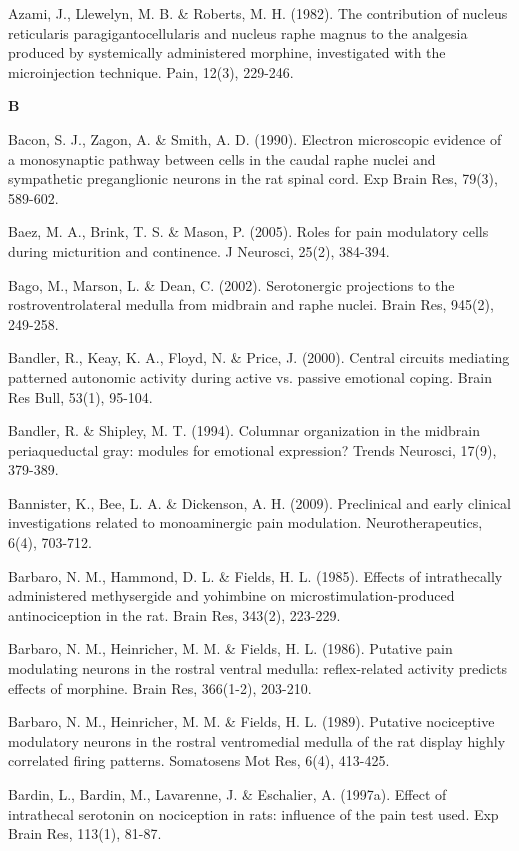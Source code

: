 \documentclass[a4paper,12pt,twoside]{report}
\begin{document}
\begin{singlespacing}
\begin{footnotesize}
Azami, J., Llewelyn, M. B. \& Roberts, M. H. (1982). The contribution of nucleus reticularis paragigantocellularis and nucleus raphe magnus to the analgesia produced by systemically administered morphine, investigated with the microinjection technique. Pain, 12(3), 229-246.

\medskip
\begin{Large}\textbf{B}\end{Large}

Bacon, S. J., Zagon, A. \& Smith, A. D. (1990). Electron microscopic evidence of a monosynaptic pathway between cells in the caudal raphe nuclei and sympathetic preganglionic neurons in the rat spinal cord. Exp Brain Res, 79(3), 589-602.

Baez, M. A., Brink, T. S. \& Mason, P. (2005). Roles for pain modulatory cells during micturition and continence. J Neurosci, 25(2), 384-394.

Bago, M., Marson, L. \& Dean, C. (2002). Serotonergic projections to the rostroventrolateral medulla from midbrain and raphe nuclei. Brain Res, 945(2), 249-258.

Bandler, R., Keay, K. A., Floyd, N. \& Price, J. (2000). Central circuits mediating patterned autonomic activity during active vs. passive emotional coping. Brain Res Bull, 53(1), 95-104.

Bandler, R. \& Shipley, M. T. (1994). Columnar organization in the midbrain periaqueductal gray: modules for emotional expression? Trends Neurosci, 17(9), 379-389.

Bannister, K., Bee, L. A. \& Dickenson, A. H. (2009). Preclinical and early clinical investigations related to monoaminergic pain modulation. Neurotherapeutics, 6(4), 703-712.

Barbaro, N. M., Hammond, D. L. \& Fields, H. L. (1985). Effects of intrathecally administered methysergide and yohimbine on microstimulation-produced antinociception in the rat. Brain Res, 343(2), 223-229.

Barbaro, N. M., Heinricher, M. M. \& Fields, H. L. (1986). Putative pain modulating neurons in the rostral ventral medulla: reflex-related activity predicts effects of morphine. Brain Res, 366(1-2), 203-210.

Barbaro, N. M., Heinricher, M. M. \& Fields, H. L. (1989). Putative nociceptive modulatory neurons in the rostral ventromedial medulla of the rat display highly correlated firing patterns. Somatosens Mot Res, 6(4), 413-425.

Bardin, L., Bardin, M., Lavarenne, J. \& Eschalier, A. (1997a). Effect of intrathecal serotonin on nociception in rats: influence of the pain test used. Exp Brain Res, 113(1), 81-87.


\end{footnotesize}
\end{singlespacing}
\end{document}
